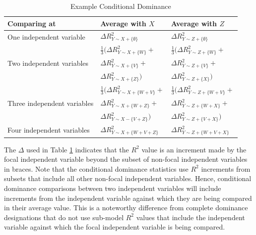 \documentclass[man]{apa7}
\begin{document}
	\begin{table}[h!]
		\centering
		\caption{\centering Example Conditional Dominance}
		\begin{tabular}{ l | l l }
			Comparing at & Average with $X$ & Average with $Z$ \\
			\hline
			One independent variable & $\Delta R^2_{Y \sim X + \{\emptyset\}}$ & $\Delta R^2_{Y \sim Z + \{\emptyset\}}$ \\
			\hline
			& $\frac{1}{3} (\Delta R^2_{Y \sim X + \{W\}} + $ & $\frac{1}{3} (\Delta R^2_{Y \sim Z + \{W\}} + $ \\
			Two independent variables & $\Delta R^2_{Y \sim X + \{V\}} + $ & $\Delta R^2_{Y \sim Z + \{V\}} + $ \\
			& $\Delta R^2_{Y \sim X + \{Z\}})$ & $\Delta R^2_{Y \sim Z + \{X\}}) $ \\
			\hline
			& $\frac{1}{3} (\Delta R^2_{Y \sim X + \{W + V\}} + $ & $\frac{1}{3} (\Delta R^2_{Y \sim Z + \{W + V\}} + $ \\
			Three independent variables & $\Delta R^2_{Y \sim X + \{W + Z\}} + $ & $\Delta R^2_{Y \sim Z + \{W + X\}} + $ \\
			& $\Delta R^2_{Y \sim X - \{V + Z\}})$ & $\Delta R^2_{Y \sim Z + \{V + X\}})$ \\
			\hline
			Four independent variables & $\Delta R^2_{Y \sim X + \{W + V + Z\}}$ & $\Delta R^2_{Y \sim Z + \{W + V + X\}}$ \\
			\hline
		\end{tabular}
		\label{tab:excdl}
	\end{table}
	
	The $\Delta$ used in Table \ref{tab:excdl} indicates that the $R^2$ value is an increment made by the focal independent variable beyond the subset of non-focal independent variables in braces.
	Note that the conditional dominance statistics use $R^2$ increments from subsets that include all other non-focal independent variables.
	Hence, conditional dominance comparisons between two independent variables will include increments from the independent variable against which they are being compared in their average value.
	This is a noteworthy difference from complete dominance designations that do not use sub-model $R^2$ values that include the independent variable against which the focal independent variable is being compared.
	
\end{document}
